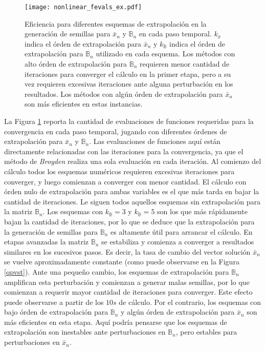 \begin{figure}[ht]
\centering
\texttt{[image: nonlinear\_fevals\_ex.pdf]}
\caption[Eficiencia para diferentes esquemas de extrapolación en la generación de semillas]
{Eficiencia para diferentes esquemas de extrapolación en la generación de semillas para $\bar{x}_n$ y $\mathbb{B}_n$ en cada paso temporal.
$k_{\bar{x}}$ indica el órden de extrapolación para $\bar{x}_n$ y $k_{\mathbb{B}}$ indica el órden de extrapolación para $\mathbb{B}_n$ utilizado en cada esquema.
Los métodos con alto órden de extrapolación para $\mathbb{B}_n$ requieren menor cantidad de iteraciones para converger el cálculo en la primer etapa,
pero a su vez requieren excesivas iteraciones ante alguna perturbación en los resultados.
Los métodos con algún órden de extrapolación para $\bar{x}_n$ son más eficientes en estas instancias.}
\label{nonlinear_fevals_ex}
\end{figure}
La Figura \ref{nonlinear_fevals_ex} reporta la cantidad de evaluaciones de funciones requeridas para la convergencia en cada paso temporal,
jugando con diferentes órdenes de extrapolación para $\bar{x}_n$ y $\mathbb{B}_n$.
Las evaluaciones de funciones aquí están directamente relacionadas con las iteraciones para la convergencia,
ya que el método de \textit{Broyden} realiza una sola evaluación en cada iteración.
Al comienzo del cálculo todos los esquemas numéricos requieren excesivas iteraciones para converger,
y luego comienzan a converger con menor cantidad.
El cálculo con órden nulo de extrapolación para ambas variables es el que más tarda en bajar la cantidad de iteraciones.
Le siguen todos aquellos esquemas sin extrapolación para la matriz $\mathbb{B}_n$.
Los esquemas con $k_{\mathbb{B}}=3$ y $k_{\mathbb{B}}=5$ son los que más rápidamente bajan la cantidad de iteraciones,
por lo que se deduce que la extrapolación para la generación de semillas para $\mathbb{B}_n$ es altamente útil para arrancar el cálculo.
En etapas avanzadas la matriz $\mathbb{B}_n$ se estabiliza y comienza a converger a resultados similares en los sucesivos pasos.
Es decir, la tasa de cambio del vector solución $\bar{x}_n$ se vuelve aproximadamente constante (como puede observarse en la Figura \ref{qpvst}).
Ante una pequeño cambio, los esquemas de extrapolación para $\mathbb{B}_n$ amplifican esta perturbación y comienzan a generar malas semillas,
por lo que comienzan a requerir mayor cantidad de iteraciones para converger.
Este efecto puede observarse a partir de los $10s$ de cálculo.
Por el contrario, los esquemas con bajo órden de extrapolación para $\mathbb{B}_n$ y algún órden de extrapolación para $\bar{x}_n$ son más eficientes en esta etapa.
Aquí podría pensarse que los esquemas de extrapolación son inestables ante perturbaciones en $\mathbb{B}_n$, pero estables para perturbaciones en $\bar{x}_n$.

